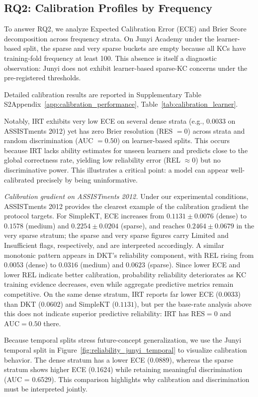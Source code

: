\subsection{RQ2: Calibration Profiles by Frequency}
To answer RQ2, we analyze Expected Calibration Error (ECE) and Brier Score decomposition across frequency strata. On Junyi Academy under the learner-based split, the sparse and very sparse buckets are empty because all KCs have training-fold frequency at least 100. This absence is itself a diagnostic observation: Junyi does not exhibit learner-based sparse-KC concerns under the pre-registered thresholds.

Detailed calibration results are reported in \ifdefined\iscompact Supplementary Table S2\else Appendix~\ref{app:calibration_performance}, Table~\ref{tab:calibration_learner}\fi.

Notably, IRT exhibits very low ECE on several dense strata (e.g., $0.0033$ on ASSISTments 2012) yet has zero Brier resolution (RES $= 0$) across strata and random discrimination (AUC $= 0.50$) on learner-based splits. This occurs because IRT lacks ability estimates for unseen learners and predicts close to the global correctness rate, yielding low reliability error (REL $\approx 0$) but no discriminative power. This illustrates a critical point: a model can appear well-calibrated precisely by being uninformative.

\textit{Calibration gradient on ASSISTments 2012.}
Under our experimental conditions, ASSISTments 2012 provides the clearest example of the calibration gradient the protocol targets. For SimpleKT, ECE increases from $0.1131 \pm 0.0076$ (dense) to $0.1578$ (medium) and $0.2254 \pm 0.0204$ (sparse), and reaches $0.2464 \pm 0.0679$ in the very sparse stratum; the sparse and very sparse figures carry Limited and Insufficient flags, respectively, and are interpreted accordingly. A similar monotonic pattern appears in DKT's reliability component, with REL rising from $0.0053$ (dense) to $0.0316$ (medium) and $0.0623$ (sparse). Since lower ECE and lower REL indicate better calibration, probability reliability deteriorates as KC training evidence decreases, even while aggregate predictive metrics remain competitive. On the same dense stratum, IRT reports far lower ECE ($0.0033$) than DKT ($0.0602$) and SimpleKT ($0.1131$), but per the base-rate analysis above this does not indicate superior predictive reliability: IRT has $\text{RES} = 0$ and $\text{AUC} = 0.50$ there.

Because temporal splits stress future-concept generalization, we use the Junyi temporal split in Figure~\ref{fig:reliability_junyi_temporal} to visualize calibration behavior. The dense stratum has a lower ECE (0.0889), whereas the sparse stratum shows higher ECE (0.1624) while retaining meaningful discrimination (AUC = 0.6529). This comparison highlights why calibration and discrimination must be interpreted jointly.

